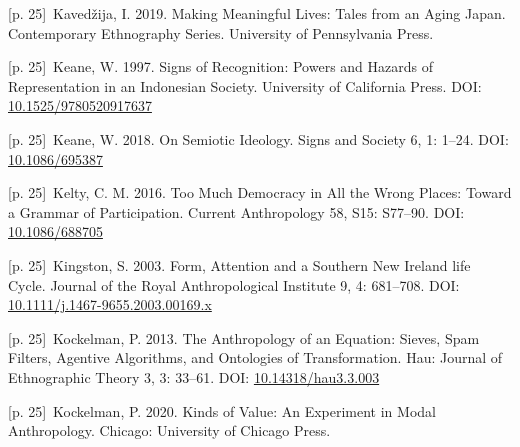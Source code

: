 \documentclass[10pt,a4paper]{article}
\begin{document}
\noindent\begin{minipage}[t]{\linewidth}{\scriptsize\color{gray} [p. 25]}\ Kavedžija, I. 2019. Making Meaningful Lives: Tales from an Aging Japan. Contemporary Ethnography Series. University of Pennsylvania Press.\par\end{minipage}\par
\noindent\begin{minipage}[t]{\linewidth}{\scriptsize\color{gray} [p. 25]}\ Keane, W. 1997. Signs of Recognition: Powers and Hazards of Representation in an Indonesian Society. University of California Press. DOI: \url{10.1525/9780520917637}\par\end{minipage}\par
\noindent\begin{minipage}[t]{\linewidth}{\scriptsize\color{gray} [p. 25]}\ Keane, W. 2018. On Semiotic Ideology. Signs and Society 6, 1: 1–24. DOI: \url{10.1086/695387}\par\end{minipage}\par
\noindent\begin{minipage}[t]{\linewidth}{\scriptsize\color{gray} [p. 25]}\ Kelty, C. M. 2016. Too Much Democracy in All the Wrong Places: Toward a Grammar of Participation. Current Anthropology 58, S15: S77–90. DOI: \url{10.1086/688705}\par\end{minipage}\par
\noindent\begin{minipage}[t]{\linewidth}{\scriptsize\color{gray} [p. 25]}\ Kingston, S. 2003. Form, Attention and a Southern New Ireland life Cycle. Journal of the Royal Anthropological Institute 9, 4: 681–708. DOI: \url{10.1111/j.1467-9655.2003.00169.x}\par\end{minipage}\par
\noindent\begin{minipage}[t]{\linewidth}{\scriptsize\color{gray} [p. 25]}\ Kockelman, P. 2013. The Anthropology of an Equation: Sieves, Spam Filters, Agentive Algorithms, and Ontologies of Transformation. Hau: Journal of Ethnographic Theory 3, 3: 33–61. DOI: \url{10.14318/hau3.3.003}\par\end{minipage}\par
\noindent\begin{minipage}[t]{\linewidth}{\scriptsize\color{gray} [p. 25]}\ Kockelman, P. 2020. Kinds of Value: An Experiment in Modal Anthropology. Chicago: University of Chicago Press.\par\end{minipage}\par
\end{document}
